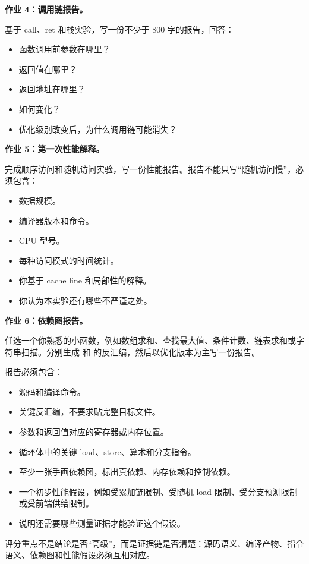 \begin{exercisebox}
\textbf{作业 4：调用链报告。}

基于 call、ret 和栈实验，写一份不少于 800 字的报告，回答：

\begin{itemize}
  \item 函数调用前参数在哪里？
  \item 返回值在哪里？
  \item 返回地址在哪里？
  \item {} 如何变化？
  \item 优化级别改变后，为什么调用链可能消失？
\end{itemize}
\end{exercisebox}

\begin{exercisebox}
\textbf{作业 5：第一次性能解释。}

完成顺序访问和随机访问实验，写一份性能报告。报告不能只写``随机访问慢''，必须包含：

\begin{itemize}
  \item 数据规模。
  \item 编译器版本和命令。
  \item CPU 型号。
  \item 每种访问模式的时间统计。
  \item 你基于 cache line 和局部性的解释。
  \item 你认为本实验还有哪些不严谨之处。
\end{itemize}
\end{exercisebox}

\begin{exercisebox}
\textbf{作业 6：依赖图报告。}

任选一个你熟悉的小函数，例如数组求和、查找最大值、条件计数、链表求和或字符串扫描。分别生成  和  的反汇编，然后以优化版本为主写一份报告。

报告必须包含：

\begin{itemize}
  \item 源码和编译命令。
  \item 关键反汇编，不要求贴完整目标文件。
  \item 参数和返回值对应的寄存器或内存位置。
  \item 循环体中的关键 load、store、算术和分支指令。
  \item 至少一张手画依赖图，标出真依赖、内存依赖和控制依赖。
  \item 一个初步性能假设，例如受累加链限制、受随机 load 限制、受分支预测限制或受前端供给限制。
  \item 说明还需要哪些测量证据才能验证这个假设。
\end{itemize}

评分重点不是结论是否“高级”，而是证据链是否清楚：源码语义、编译产物、指令语义、依赖图和性能假设必须互相对应。
\end{exercisebox}

